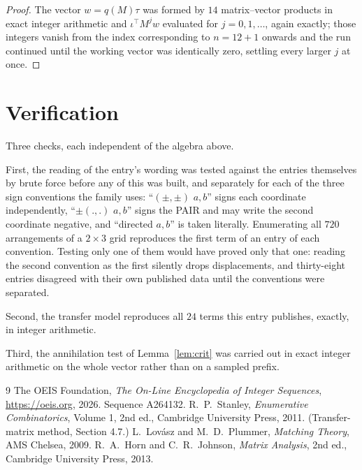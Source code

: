 \documentclass[11pt,a4paper]{article}
\theoremstyle{plain}
\theoremstyle{definition}
\begin{document}
\begin{proof}
The vector $w=q(M)\tau$ was formed by $14$ matrix--vector products in exact integer
arithmetic and $\iota^{\!\top}M^{j}w$ evaluated for $j=0,1,\dots$, again exactly; those
integers vanish from the index corresponding to $n=12+1$ onwards and the run continued
until the working vector was identically zero, settling every larger $j$ at once.
\end{proof}

\section{Verification}

Three checks, each independent of the algebra above.

First, the reading of the entry's wording was tested against the entries themselves by brute
force before any of this was built, and separately for each of the three sign conventions the
family uses: ``$(\pm,\pm)$ $a,b$'' signs each coordinate independently, ``$\pm(.,.)$ $a,b$''
signs the PAIR and may write the second coordinate negative, and ``directed $a,b$'' is taken
literally. Enumerating all $720$ arrangements of a $2\times3$ grid reproduces the first term
of an entry of each convention. Testing only one of them would have proved only that one:
reading the second convention as the first silently drops displacements, and thirty-eight
entries disagreed with their own published data until the conventions were separated.

Second, the transfer model reproduces all $24$ terms this entry publishes, exactly, in
integer arithmetic.

Third, the annihilation test of Lemma~\ref{lem:crit} was carried out in exact integer
arithmetic on the whole vector rather than on a sampled prefix.

\begin{thebibliography}{9}
 The OEIS Foundation, \emph{The On-Line Encyclopedia of Integer
Sequences}, \url{https://oeis.org}, 2026. Sequence A264132.
 R.~P.~Stanley, \emph{Enumerative Combinatorics}, Volume 1, 2nd ed.,
Cambridge University Press, 2011. (Transfer-matrix method, Section 4.7.)
 L.~Lov\'asz and M.~D.~Plummer, \emph{Matching Theory}, AMS Chelsea, 2009.
 R.~A.~Horn and C.~R.~Johnson, \emph{Matrix Analysis}, 2nd ed., Cambridge
University Press, 2013.
\end{thebibliography}
\end{document}
